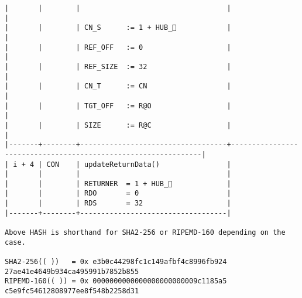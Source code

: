 \documentclass[varwidth=\maxdimen,margin=0.5cm,multi={verbatim}]{standalone}
\begin{document}
\begin{verbatim}
|       |        |                                   |                                                               |
|       |        | CN_S      := 1 + HUB_            |                                                               |
|       |        | REF_OFF   := 0                    |                                                               |
|       |        | REF_SIZE  := 32                   |                                                               |
|       |        | CN_T      := CN                   |                                                               |
|       |        | TGT_OFF   := R@O                  |                                                               |
|       |        | SIZE      := R@C                  |                                                               |
|-------+--------+-----------------------------------+---------------------------------------------------------------|
| i + 4 | CON    | updateReturnData()                |
|       |        |                                   |
|       |        | RETURNER  = 1 + HUB_             |
|       |        | RDO       = 0                     |
|       |        | RDS       = 32                    |
|-------+--------+-----------------------------------|

Above HASH is shorthand for SHA2-256 or RIPEMD-160 depending on the case.

SHA2-256(( ))   = 0x e3b0c44298fc1c149afbf4c8996fb924 27ae41e4649b934ca495991b7852b855
RIPEMD-160(( )) = 0x 0000000000000000000000009c1185a5 c5e9fc54612808977ee8f548b2258d31
\end{verbatim}
\end{document}
